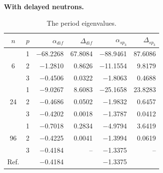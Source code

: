 \documentclass[authoryear]{elsarticle}
\begin{document}
\textbf{With delayed neutrons.}


\begin{table}[h]
\caption{The period eigenvalues.}
\label{tab:iaea_with_alpha_del}
\begin{center}
\begin{tabular}{c c r r r r}
\hline
$n$ & $p$ & $\alpha_{dif}$ & $\Delta_{dif}$ &$\alpha_{sp_3}$& $\Delta_{sp_3}$ \\
\hline
	& 1	&$-$68.2268 &67.8084& $-$88.9461 &87.6086\\
6	& 2	& $-$1.2810 & 0.8626& $-$11.1554 & 9.8179\\
	& 3	& $-$0.4506 & 0.0322&  $-$1.8063 & 0.4688\\ 
\hline
	& 1	& $-$9.0267  & 8.6083&$-$25.1658 &23.8283\\
24& 2	& $-$0.4686  & 0.0502& $-$1.9832 & 0.6457\\
	& 3	& $-$0.4202  & 0.0018& $-$1.3787 & 0.0412\\ 
\hline
	& 1	& $-$0.7018  & 0.2834& $-$4.9794 & 3.6419\\
96& 2	& $-$0.4225  & 0.0041& $-$1.3994 & 0.0619\\
	& 3	& $-$0.4184  &    -- & $-$1.3375 &    --\\ 
\hline
Ref.& & $-$0.4184 & & $-$1.3375 \\ 
\hline
\end{tabular}
\end{center}
\end{table}
\end{document}

